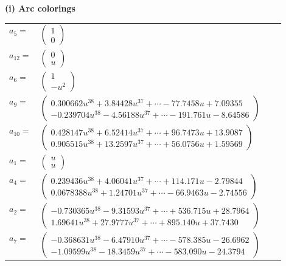 \documentclass[1p]{elsarticle_modified}
\theoremstyle{definition}
\begin{document}
\flushleft \textbf{(i) Arc colorings}\\
\begin{tabular}{m{7pt} m{180pt} m{7pt} m{180pt} }
\flushright $a_{5}=$&$\begin{pmatrix}1\\0\end{pmatrix}$ \\
\flushright $a_{12}=$&$\begin{pmatrix}0\\u\end{pmatrix}$ \\
\flushright $a_{6}=$&$\begin{pmatrix}1\\- u^2\end{pmatrix}$ \\
\flushright $a_{9}=$&$\begin{pmatrix}0.300662 u^{38}+3.84428 u^{37}+\cdots-77.7458 u+7.09355\\-0.239704 u^{38}-4.56188 u^{37}+\cdots-191.761 u-8.64586\end{pmatrix}$ \\
\flushright $a_{10}=$&$\begin{pmatrix}0.428147 u^{38}+6.52414 u^{37}+\cdots+96.7473 u+13.9087\\0.905515 u^{38}+13.2597 u^{37}+\cdots+56.0756 u+1.59569\end{pmatrix}$ \\
\flushright $a_{1}=$&$\begin{pmatrix}u\\u\end{pmatrix}$ \\
\flushright $a_{4}=$&$\begin{pmatrix}0.239436 u^{38}+4.06041 u^{37}+\cdots+114.171 u-2.79844\\0.0678388 u^{38}+1.24701 u^{37}+\cdots-66.9463 u-2.74556\end{pmatrix}$ \\
\flushright $a_{2}=$&$\begin{pmatrix}-0.730365 u^{38}-9.31593 u^{37}+\cdots+536.715 u+28.7964\\1.69641 u^{38}+27.9777 u^{37}+\cdots+895.140 u+37.7430\end{pmatrix}$ \\
\flushright $a_{7}=$&$\begin{pmatrix}-0.368631 u^{38}-6.47910 u^{37}+\cdots-578.385 u-26.6962\\-1.09599 u^{38}-18.3459 u^{37}+\cdots-583.090 u-24.3794\end{pmatrix}$ \\

\end{tabular}
\end{document}
